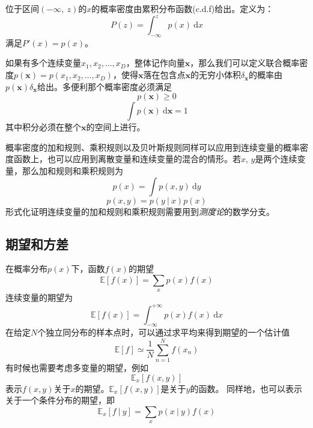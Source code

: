 \documentclass[11pt]{ctexbook}
\begin{document}
位于区间$(-\infty,\ z)$的$x$的概率密度由累积分布函数(c.d.f)给出。定义为：
\begin{equation}
	P(z) = \int_{-\infty}^{z}p(x)\ \mathrm{d}x
\end{equation}
满足$P'(x) = p(x)$。

如果有多个连续变量$x_1, x_2, \ldots, x_D$，整体记作向量$\bm x$，那么我们可以定义联合概率密度$p(\bm x) = p(x_1, x_2, \ldots, x_D)$，使得$\bm x$落在包含点$\bm x$的无穷小体积$\delta_{\bm x}$的概率由$p(\bm x) \delta_{\bm x}$给出。多便利那个概率密度必须满足
\begin{equation}
	p(\bm x) \geqslant 0
\end{equation}
\begin{equation}
	\int p(\bm x)\ \mathrm{d}\bm x = 1
\end{equation}
其中积分必须在整个$\bm x$的空间上进行。

概率密度的加和规则、乘积规则以及贝叶斯规则同样可以应用到连续变量的概率密度函数上，也可以应用到离散变量和连续变量的混合的情形。若$x$, $y$是两个连续变量，那么加和规则和乘积规则为
\begin{equation}
	p(x) = \int p(x, y)\ \mathrm{d}y
\end{equation}
\begin{equation}
	p(x, y) = p(y\ |\ x)p(x)
\end{equation}
形式化证明连续变量的加和规则和乘积规则需要用到\emph{测度论}的数学分支。

\subsection{期望和方差}
在概率分布$p(x)$下，函数$f(x)$的期望
\begin{equation}
	\mathbb E[f(x)] = \sum_{x}p(x)f(x) 
\end{equation}
连续变量的期望为
\begin{equation}
	\mathbb E[f(x)] = \int_{-\infty}^{+\infty}p(x)f(x)\ \mathrm{d}x
\end{equation}
在给定$N$个独立同分布的样本点时，可以通过求平均来得到期望的一个估计值
\begin{equation}
	\mathbb E[f] \simeq \frac{1}{N}\sum_{n=1}^{N} f(x_n)
\end{equation}
有时候也需要考虑多变量的期望，例如
\begin{equation}
	\mathbb E_x[f(x, y)]
\end{equation}
表示$f(x, y)$关于$x$的期望。$\mathbb E_x[f(x, y)]$是关于$y$的函数。
同样地，也可以表示关于一个条件分布的期望，即
\begin{equation}
	\mathbb E_x[f\ |\ y] = \sum_x p(x\ |\ y)f(x)
\end{equation}
\end{document}
